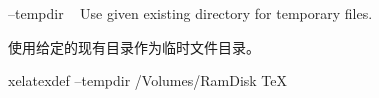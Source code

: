 \begin{docKey}
{--tempdir }{~}%
{}%
Use given existing directory for temporary files.

使用给定的现有目录作为临时文件目录。

\begin{commandshell}
xelatexdef --tempdir /Volumes/RamDisk TeX
\end{commandshell}
\end{docKey}
